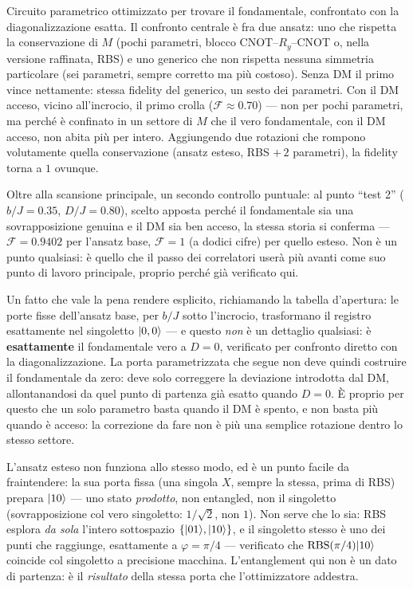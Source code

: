 \documentclass[11pt,a4paper]{article}
\begin{document}
Circuito parametrico ottimizzato per trovare il fondamentale, confrontato
con la diagonalizzazione esatta. Il confronto centrale è fra due ansatz:
uno che rispetta la conservazione di $M$ (pochi parametri, blocco
CNOT--$R_y$--CNOT o, nella versione raffinata, RBS) e uno generico che non
rispetta nessuna simmetria particolare (sei parametri, sempre corretto ma
più costoso). Senza DM il primo vince nettamente: stessa fidelity del
generico, un sesto dei parametri. Con il DM acceso, vicino all'incrocio,
il primo crolla ($\mathcal F\approx0.70$) --- non per pochi parametri, ma
perché è confinato in un settore di $M$ che il vero fondamentale, con il
DM acceso, non abita più per intero. Aggiungendo due rotazioni che rompono
volutamente quella conservazione (ansatz esteso, RBS $+\,2$ parametri), la
fidelity torna a $1$ ovunque.

Oltre alla scansione principale, un secondo controllo puntuale: al punto
``test 2'' ($b/J=0.35$, $D/J=0.80$), scelto apposta perché il
fondamentale sia una sovrapposizione genuina e il DM sia ben acceso, la
stessa storia si conferma --- $\mathcal F=0.9402$ per l'ansatz base,
$\mathcal F=1$ (a dodici cifre) per quello esteso. Non è un punto
qualsiasi: è quello che il passo dei correlatori userà più avanti come
suo punto di lavoro principale, proprio perché già verificato qui.

Un fatto che vale la pena rendere esplicito, richiamando la tabella
d'apertura: le porte fisse dell'ansatz base, per $b/J$ sotto
l'incrocio, trasformano il registro esattamente nel singoletto
$\lvert 0,0\rangle$ --- e questo \emph{non} è un dettaglio qualsiasi: è
\textbf{esattamente} il fondamentale vero a $D=0$, verificato per
confronto diretto con la diagonalizzazione. La porta parametrizzata che
segue non deve quindi costruire il fondamentale da zero: deve solo
correggere la deviazione introdotta dal DM, allontanandosi da quel punto
di partenza già esatto quando $D=0$. È proprio per questo che un solo
parametro basta quando il DM è spento, e non basta più quando è acceso:
la correzione da fare non è più una semplice rotazione dentro lo stesso
settore.

L'ansatz esteso non funziona allo stesso modo, ed è un punto facile da
fraintendere: la sua porta fissa (una singola $X$, sempre la stessa,
prima di RBS) prepara $\lvert 10\rangle$ --- uno stato \emph{prodotto}, non
entangled, non il singoletto (sovrapposizione col vero singoletto:
$1/\sqrt2$, non $1$). Non serve che lo sia: RBS esplora \emph{da sola}
l'intero sottospazio $\{\lvert 01\rangle,\lvert 10\rangle\}$, e il singoletto stesso è
uno dei punti che raggiunge, esattamente a $\varphi=\pi/4$ --- verificato
che $\text{RBS}(\pi/4)\lvert 10\rangle$ coincide col singoletto a precisione
macchina. L'entanglement qui non è un dato di partenza: è il
\emph{risultato} della stessa porta che l'ottimizzatore addestra.
\end{document}
